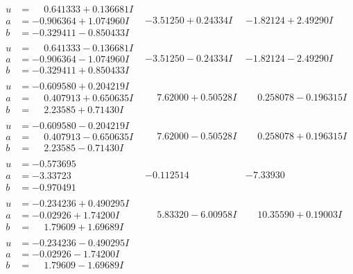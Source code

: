 \documentclass[1p]{elsarticle_modified}
\theoremstyle{definition}
\begin{document}
$$\begin{array}{c|c|c}
\begin{aligned}
u &= \phantom{-}0.641333 + 0.136681 I \\
a &= -0.906364 + 1.074960 I \\
b &= -0.329411 - 0.850433 I\end{aligned}
 & -3.51250 + 0.24334 I & -1.82124 + 2.49290 I \\ \hline\begin{aligned}
u &= \phantom{-}0.641333 - 0.136681 I \\
a &= -0.906364 - 1.074960 I \\
b &= -0.329411 + 0.850433 I\end{aligned}
 & -3.51250 - 0.24334 I & -1.82124 - 2.49290 I \\ \hline\begin{aligned}
u &= -0.609580 + 0.204219 I \\
a &= \phantom{-}0.407913 + 0.650635 I \\
b &= \phantom{-}2.23585 + 0.71430 I\end{aligned}
 & \phantom{-}7.62000 + 0.50528 I & \phantom{-}0.258078 - 0.196315 I \\ \hline\begin{aligned}
u &= -0.609580 - 0.204219 I \\
a &= \phantom{-}0.407913 - 0.650635 I \\
b &= \phantom{-}2.23585 - 0.71430 I\end{aligned}
 & \phantom{-}7.62000 - 0.50528 I & \phantom{-}0.258078 + 0.196315 I \\ \hline\begin{aligned}
u &= -0.573695\phantom{ +0.000000I} \\
a &= -3.33723\phantom{ +0.000000I} \\
b &= -0.970491\phantom{ +0.000000I}\end{aligned}
 & -0.112514\phantom{ +0.000000I} & -7.33930\phantom{ +0.000000I} \\ \hline\begin{aligned}
u &= -0.234236 + 0.490295 I \\
a &= -0.02926 + 1.74200 I \\
b &= \phantom{-}1.79609 + 1.69689 I\end{aligned}
 & \phantom{-}5.83320 - 6.00958 I & \phantom{-}10.35590 + 0.19003 I \\ \hline\begin{aligned}
u &= -0.234236 - 0.490295 I \\
a &= -0.02926 - 1.74200 I \\
b &= \phantom{-}1.79609 - 1.69689 I\end{aligned}

\end{array}$$
\end{document}
